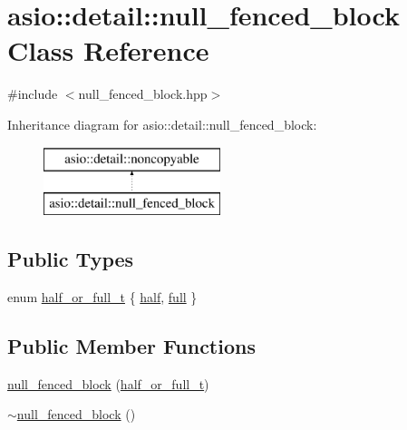 \hypertarget{classasio_1_1detail_1_1null__fenced__block}{}\section{asio\+:\+:detail\+:\+:null\+\_\+fenced\+\_\+block Class Reference}
\label{classasio_1_1detail_1_1null__fenced__block}


{\ttfamily \#include $<$null\+\_\+fenced\+\_\+block.\+hpp$>$}

Inheritance diagram for asio\+:\+:detail\+:\+:null\+\_\+fenced\+\_\+block\+:\begin{figure}[H]
\begin{center}
\leavevmode
\includegraphics[height=2.000000cm]{classasio_1_1detail_1_1null__fenced__block}
\end{center}
\end{figure}
\subsection*{Public Types}
\begin{DoxyCompactItemize}
\item 
enum \hyperlink{classasio_1_1detail_1_1null__fenced__block_a21c66218b4c10beb58f227cc40b655df}{half\+\_\+or\+\_\+full\+\_\+t} \{ \hyperlink{classasio_1_1detail_1_1null__fenced__block_a21c66218b4c10beb58f227cc40b655dfa29ffa18b5d61c64e079ea16805204313}{half}, 
\hyperlink{classasio_1_1detail_1_1null__fenced__block_a21c66218b4c10beb58f227cc40b655dfa267449df5188d34568ed687c76e54bea}{full}
 \}
\end{DoxyCompactItemize}
\subsection*{Public Member Functions}
\begin{DoxyCompactItemize}
\item 
\hyperlink{classasio_1_1detail_1_1null__fenced__block_aaa43245032f780a9fbd1325e185b2ea2}{null\+\_\+fenced\+\_\+block} (\hyperlink{classasio_1_1detail_1_1null__fenced__block_a21c66218b4c10beb58f227cc40b655df}{half\+\_\+or\+\_\+full\+\_\+t})
\item 
\hyperlink{classasio_1_1detail_1_1null__fenced__block_a54d024899282a0d1dd76a8f0c1adbe35}{$\sim$null\+\_\+fenced\+\_\+block} ()
\end{DoxyCompactItemize}


